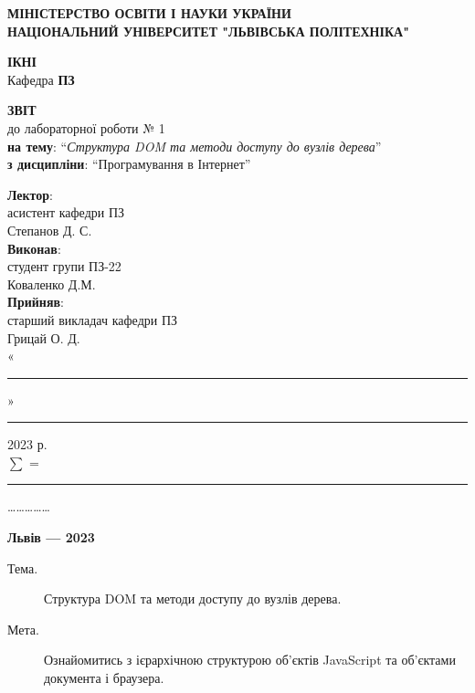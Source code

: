 \documentclass[oneside,14pt]{extarticle}
\newcommand\subject{Програмування в Інтернет}
\newcommand\lecturer{асистент кафедри ПЗ \\ Степанов Д. С.}
\newcommand\teacher{старший викладач кафедри ПЗ \\ Грицай О. Д.}
\newcommand\mygroup{ПЗ-22}
\newcommand\lab{1}
\newcommand\theme{Структура DOM та методи доступу до вузлів дерева}
\newcommand\purpose{Ознайомитись з ієрархічною структурою об’єктів JavaScript та об’єктами
	документа і браузера}
\begin{document}
\begin{normalsize}
	\begin{titlepage}
		\thispagestyle{empty}
		\begin{center}
			\textbf{МІНІСТЕРСТВО ОСВІТИ І НАУКИ УКРАЇНИ\\
				НАЦІОНАЛЬНИЙ УНІВЕРСИТЕТ "ЛЬВІВСЬКА ПОЛІТЕХНІКА"}
		\end{center}
		\begin{flushright}
			\textbf{ІКНІ}\\
			Кафедра \textbf{ПЗ}
		\end{flushright}
		\vspace{70pt}
		\begin{center}
			\textbf{ЗВІТ}\\
			\vspace{10pt}
			до лабораторної роботи № \lab\\
			\textbf{на тему}: “\textit{\theme}”\\
			\textbf{з дисципліни}: “\subject”
		\end{center}
		\vspace{50pt}
		\begin{flushright}
			
			\textbf{Лектор}:\\
			\lecturer\\
			\vspace{10pt}
			\textbf{Виконав}:\\
			
			студент групи \mygroup\\
			Коваленко Д.М.\\
			\vspace{10pt}
			\textbf{Прийняв}:\\
			
			\teacher\\
			
			\vspace{28pt}
			«\rule{1cm}{0.15mm}» \rule{1.5cm}{0.15mm} 2023 р.\\
			$\sum$ = \rule{1cm}{0.15mm}……………\\
			
		\end{flushright}
		\vspace{\fill}
		\begin{center}
			\textbf{Львів — 2023}
		\end{center}
	\end{titlepage}
		
	\begin{description}
		\item[Тема.] \theme.
		\item[Мета.] \purpose.
	\end{description}


\end{normalsize}
\end{document}
